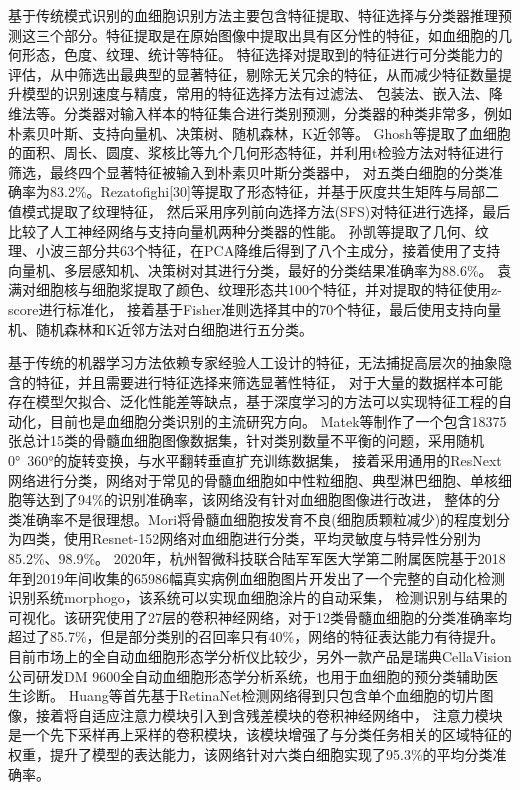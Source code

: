 基于传统模式识别的血细胞识别方法主要包含特征提取、特征选择与分类器推理预测这三个部分。特征提取是在原始图像中提取出具有区分性的特征，如血细胞的几何形态，色度、纹理、统计等特征。
特征选择对提取到的特征进行可分类能力的评估，从中筛选出最典型的显著特征，剔除无关冗余的特征，从而减少特征数量提升模型的识别速度与精度，常用的特征选择方法有过滤法、
包装法、嵌入法、降维法等。分类器对输入样本的特征集合进行类别预测，分类器的种类非常多，例如朴素贝叶斯、支持向量机、决策树、随机森林，K近邻等。
Ghosh\cite{ghosh2010statistical}等提取了血细胞的面积、周长、圆度、浆核比等九个几何形态特征，并利用t检验方法对特征进行筛选，最终四个显著特征被输入到朴素贝叶斯分类器中，
对五类白细胞的分类准确率为83.2\%。Rezatofighi[30]等提取了形态特征，并基于灰度共生矩阵与局部二值模式提取了纹理特征，
然后采用序列前向选择方法(SFS)对特征进行选择，最后比较了人工神经网络与支持向量机两种分类器的性能。
孙凯\cite{sunkai2020}等提取了几何、纹理、小波三部分共63个特征，在PCA降维后得到了八个主成分，接着使用了支持向量机、多层感知机、决策树对其进行分类，最好的分类结果准确率为88.6\%。
袁满\cite{yuan2017}对细胞核与细胞浆提取了颜色、纹理形态共100个特征，并对提取的特征使用z-score进行标准化，
接着基于Fisher准则选择其中的70个特征，最后使用支持向量机、随机森林和K近邻方法对白细胞进行五分类。

基于传统的机器学习方法依赖专家经验人工设计的特征，无法捕捉高层次的抽象隐含的特征，并且需要进行特征选择来筛选显著性特征，
对于大量的数据样本可能存在模型欠拟合、泛化性能差等缺点，基于深度学习的方法可以实现特征工程的自动化，目前也是血细胞分类识别的主流研究方向。
Matek\cite{matek2019human}等制作了一个包含18375张总计15类的骨髓血细胞图像数据集，针对类别数量不平衡的问题，采用随机0°~360°的旋转变换，与水平翻转垂直扩充训练数据集，
接着采用通用的ResNext网络进行分类，网络对于常见的骨髓血细胞如中性粒细胞、典型淋巴细胞、单核细胞等达到了94\%的识别准确率，该网络没有针对血细胞图像进行改进，
整体的分类准确率不是很理想。Mori\cite{mori2020assessment}将骨髓血细胞按发育不良(细胞质颗粒减少)的程度划分为四类，使用Resnet-152网络对血细胞进行分类，平均灵敏度与特异性分别为85.2\%、98.9\%。
2020年，杭州智微科技\cite{fu2020morphogo}联合陆军军医大学第二附属医院基于2018年到2019年间收集的65986幅真实病例血细胞图片开发出了一个完整的自动化检测识别系统morphogo，该系统可以实现血细胞涂片的自动采集，
检测识别与结果的可视化。该研究使用了27层的卷积神经网络，对于12类骨髓血细胞的分类准确率均超过了85.7\%，但是部分类别的召回率只有40\%，网络的特征表达能力有待提升。
目前市场上的全自动血细胞形态学分析仪比较少，另外一款产品是瑞典CellaVision公司研发DM 9600全自动血细胞形态学分析系统，也用于血细胞的预分类辅助医生诊断。
Huang\cite{huang2020attention}等首先基于RetinaNet检测网络得到只包含单个血细胞的切片图像，接着将自适应注意力模块引入到含残差模块的卷积神经网络中，
注意力模块是一个先下采样再上采样的卷积模块，该模块增强了与分类任务相关的区域特征的权重，提升了模型的表达能力，该网络针对六类白细胞实现了95.3\%的平均分类准确率。

